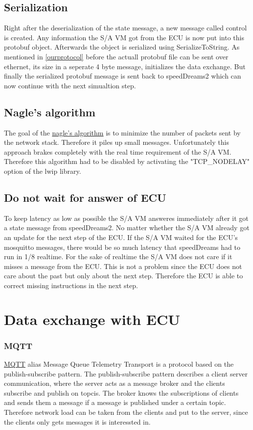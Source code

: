 \documentclass[paper=a4, fontsize=11pt]{scrreprt}
\begin{document}
  \subsection{Serialization}
Right after the deserialization of the state message, a new message called control is created. Any information the S/A VM got from the ECU is now put into this protobuf object. Afterwards the object is serialized using SerializeToString. As mentioned in \ref{ourprotocol} before the actuall protobuf file can be sent over ethernet, its size in a seperate 4 byte message, initializes the data exchange. But finally the serialized protobuf message is sent back to speedDreams2 which can now continue with the next simualtion step.
  \subsection{Nagle's algorithm}
The goal of the \href{https://www.lifewire.com/nagle-algorithm-for-tcp-network-communication-817932}{nagle's algorithm} is to minimize the number of packets sent by the network stack. Therefore it piles up small messages. Unfortunately this approach brakes completely with the real time requirement of the S/A VM. Therefore this algorithm had to be disabled by activating the "TCP\_NODELAY" option of the lwip library.
  \subsection{Do not wait for answer of ECU}
To keep latency as low as possible the S/A VM answeres immediately after it got a state message from speedDreams2. No matter whether the S/A VM already got an update for the next step of the ECU. If the S/A VM waited for the ECU's mosquitto messages, there would be so much latency that speedDreams had to run in 1/8 realtime. For the sake of realtime the S/A VM does not care if it misses a message from the ECU. This is not a problem since the ECU does not care about the past but only about the next step. Therefore the ECU is able to correct missing instructions in the next step.
\newpage
\section{Data exchange with ECU}
  \subsubsection{MQTT}
\href{http://mqtt.org/}{MQTT} alias Message Queue Telemetry Transport is a protocol based on the publish-subscribe pattern.\newline
The publish-subscribe pattern describes a client server communication, where the server acts as a message broker and the clients subscribe and publish on topcis. The broker knows the subscriptions of clients and sends them a message if a message is published under a certain topic. Therefore network load can be taken from the clients and put to the server, since the clients only gets messages it is interessted in.
\end{document}
